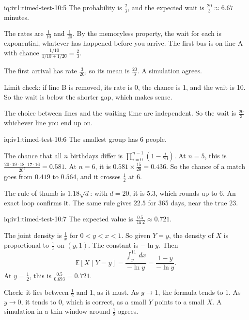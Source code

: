 \begin{solution}{iq:iv1:timed-test-10:5}
The probability is $\frac23$, and the expected wait is $\frac{20}{3} \approx 6.67$ minutes.

The rates are $\frac{1}{10}$ and $\frac{1}{20}$. By the memoryless property, the wait for each is exponential, whatever has happened before you arrive. The first bus is on line A with chance $\frac{1/10}{1/10 + 1/20} = \frac23$.

The first arrival has rate $\frac{3}{20}$, so its mean is $\frac{20}{3}$. A simulation agrees.

Limit check: if line B is removed, its rate is 0, the chance is 1, and the wait is 10. So the wait is below the shorter gap, which makes sense.

The choice between lines and the waiting time are independent. So the wait is $\frac{20}{3}$ whichever line you end up on.

\end{solution}

\begin{solution}{iq:iv1:timed-test-10:6}
The smallest group has 6 people.

The chance that all $n$ birthdays differ is $\prod_{i = 0}^{n - 1}(1 - \frac{i}{20})$. At $n = 5$, this is $\frac{20 \cdot 19 \cdot 18 \cdot 17 \cdot 16}{20^5} = 0.581$. At $n = 6$, it is $0.581 \times \frac{15}{20} = 0.436$. So the chance of a match goes from $0.419$ to $0.564$, and it crosses $\frac12$ at 6.

The rule of thumb is $1.18\sqrt{d}$: with $d = 20$, it is $5.3$, which rounds up to 6. An exact loop confirms it. The same rule gives $22.5$ for 365 days, near the true 23.

\end{solution}

\begin{solution}{iq:iv1:timed-test-10:7}
The expected value is $\frac{0.5}{\ln 2} \approx 0.721$.

The joint density is $\frac1x$ for $0 < y < x < 1$. So given $Y = y$, the density of $X$ is proportional to $\frac1x$ on $(y, 1)$. The constant is $-\ln y$. Then
\[
\mathbb{E}[X \mid Y = y] = \frac{\int_y^11\,dx}{-\ln y} = \frac{1 - y}{-\ln y}.
\]
At $y = \frac12$, this is $\frac{0.5}{0.693} = 0.721$.

Check: it lies between $\frac12$ and 1, as it must. As $y \to 1$, the formula tends to 1. As $y \to 0$, it tends to 0, which is correct, as a small $Y$ points to a small $X$. A simulation in a thin window around $\frac12$ agrees.

\end{solution}

